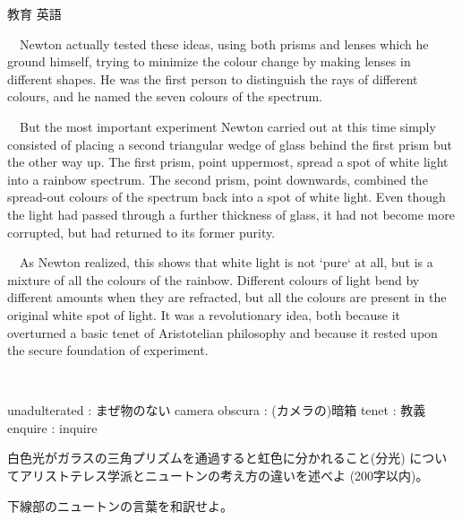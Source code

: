 \documentclass[fleqn]{jbook}
\begin{document}
\begin{question}{教育 英語}{}
\begin{subquestions}
  　Newton actually tested these ideas, using both prisms and lenses
  which he ground himself, trying to minimize the colour change
  by making lenses in different shapes. He was the first person
  to distinguish the rays of different colours, and he named the
  seven colours of the spectrum.

  　But the most important experiment Newton carried out at this
  time simply consisted of placing a second triangular wedge of
  glass behind the first prism but the other way up. The first
  prism, point uppermost, spread a spot of white light into a
  rainbow spectrum. The second prism, point downwards, combined
  the spread-out colours of the spectrum back into a spot of white
  light. Even though the light had passed through a further
  thickness of glass, it had not become more corrupted, but had
  returned to its former purity.

  　As Newton realized, this shows that white light is not `pure`
  at all, but is a mixture of all the colours of the rainbow.
  Different colours of light bend by different amounts when they
  are refracted, but all the colours are present in the original
  white spot of light. It was a revolutionary idea, both because
  it overturned a basic tenet of Aristotelian philosophy and
  because it rested upon the secure foundation of experiment.



  unadulterated  : まぜ物のない \quad
  camera obscura : (カメラの)暗箱 \quad
  tenet          : 教義 \quad
  enquire        : inquire
\baselineskip=15pt
  \begin{subsubquestions}
  \SubSubQuestion
    白色光がガラスの三角プリズムを通過すると虹色に分かれること(分光)
    についてアリストテレス学派とニュートンの考え方の違いを述べよ
    (200字以内)。

  \SubSubQuestion
    下線部のニュートンの言葉を和訳せよ。
  \end{subsubquestions}


\end{subquestions}
\end{question}
\end{document}
